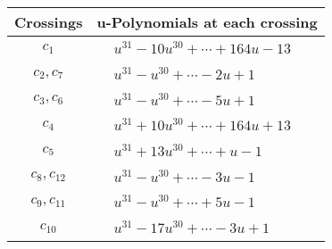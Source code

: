 \documentclass[1p]{elsarticle_modified}
\theoremstyle{definition}
\begin{document}
\begin{tabular}{m{50pt}|m{274pt}}
Crossings & \hspace{64pt}u-Polynomials at each crossing \\
\hline $$\begin{aligned}c_{1}\end{aligned}$$&$\begin{aligned}
&u^{31}-10 u^{30}+\cdots+164 u-13
\end{aligned}$\\
\hline $$\begin{aligned}c_{2},c_{7}\end{aligned}$$&$\begin{aligned}
&u^{31}- u^{30}+\cdots-2 u+1
\end{aligned}$\\
\hline $$\begin{aligned}c_{3},c_{6}\end{aligned}$$&$\begin{aligned}
&u^{31}- u^{30}+\cdots-5 u+1
\end{aligned}$\\
\hline $$\begin{aligned}c_{4}\end{aligned}$$&$\begin{aligned}
&u^{31}+10 u^{30}+\cdots+164 u+13
\end{aligned}$\\
\hline $$\begin{aligned}c_{5}\end{aligned}$$&$\begin{aligned}
&u^{31}+13 u^{30}+\cdots+u-1
\end{aligned}$\\
\hline $$\begin{aligned}c_{8},c_{12}\end{aligned}$$&$\begin{aligned}
&u^{31}- u^{30}+\cdots-3 u-1
\end{aligned}$\\
\hline $$\begin{aligned}c_{9},c_{11}\end{aligned}$$&$\begin{aligned}
&u^{31}- u^{30}+\cdots+5 u-1
\end{aligned}$\\
\hline $$\begin{aligned}c_{10}\end{aligned}$$&$\begin{aligned}
&u^{31}-17 u^{30}+\cdots-3 u+1
\end{aligned}$\\
\hline
\end{tabular}\\~\\
\end{document}
